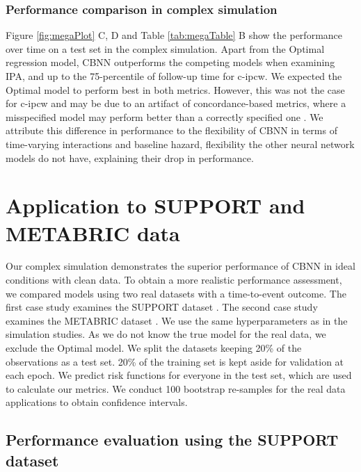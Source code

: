 \documentclass[AMA,STIX1COL,]{WileyNJD-v2}
\begin{document}
\hypertarget{performance-comparison-in-complex-simulation}{%
\subsubsection{Performance comparison in complex
simulation}\label{performance-comparison-in-complex-simulation}}

Figure \ref{fig:megaPlot} C, D and Table \ref{tab:megaTable} B show the
performance over time on a test set in the complex simulation. Apart
from the Optimal regression model, CBNN outperforms the competing models
when examining IPA, and up to the 75-percentile of follow-up time for
c-ipcw. We expected the Optimal model to perform best in both metrics.
However, this was not the case for c-ipcw and may be due to an artifact
of concordance-based metrics, where a misspecified model may perform
better than a correctly specified one \citep{cindexfails2019}. We
attribute this difference in performance to the flexibility of CBNN in
terms of time-varying interactions and baseline hazard, flexibility the
other neural network models do not have, explaining their drop in
performance.

\hypertarget{casestudies}{%
\section{Application to SUPPORT and METABRIC data}\label{casestudies}}

Our complex simulation demonstrates the superior performance of CBNN in
ideal conditions with clean data. To obtain a more realistic performance
assessment, we compared models using two real datasets with a
time-to-event outcome. The first case study examines the SUPPORT dataset
\citep{knaus1995SUPPORT}. The second case study examines the METABRIC
dataset \citep{curtis2012genomic}. We use the same hyperparameters as in
the simulation studies. As we do not know the true model for the real
data, we exclude the Optimal model. We split the datasets keeping 20\%
of the observations as a test set. 20\% of the training set is kept
aside for validation at each epoch. We predict risk functions for
everyone in the test set, which are used to calculate our metrics. We
conduct 100 bootstrap re-samples for the real data applications to
obtain confidence intervals.

\hypertarget{performance-evaluation-using-the-support-dataset}{%
\subsection{Performance evaluation using the SUPPORT
dataset}\label{performance-evaluation-using-the-support-dataset}}
\end{document}
